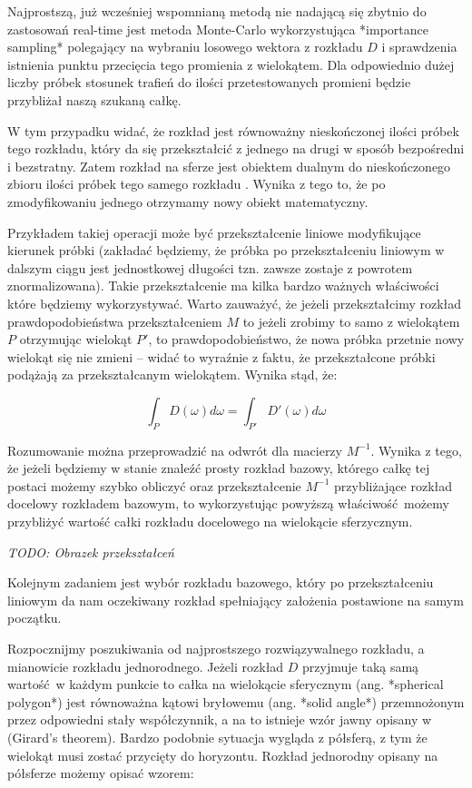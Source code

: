 \documentclass[../main.tex]{subfiles}
\begin{document}
Najprostszą, już wcześniej wspomnianą metodą nie nadającą się zbytnio do
zastosowań real-time jest metoda Monte-Carlo wykorzystująca *importance
sampling* polegający na wybraniu losowego wektora z rozkładu $D$ i sprawdzenia
istnienia punktu przecięcia tego promienia z wielokątem. Dla odpowiednio dużej
liczby próbek stosunek trafień do ilości przetestowanych promieni będzie
przybliżał naszą szukaną całkę.

W tym przypadku widać, że rozkład jest równoważny nieskończonej ilości próbek
tego rozkładu, który da się przekształcić z jednego na drugi w sposób
bezpośredni i bezstratny. Zatem rozkład na sferze jest obiektem dualnym do
nieskończonego zbioru ilości próbek tego samego rozkładu \cite{ltc_heitz}.
Wynika z tego to, że po zmodyfikowaniu jednego otrzymamy nowy obiekt
matematyczny.

Przykładem takiej operacji może być przekształcenie liniowe modyfikujące
kierunek próbki (zakładać będziemy, że próbka po przekształceniu liniowym w
dalszym ciągu jest jednostkowej długości tzn. zawsze zostaje z powrotem
znormalizowana). Takie przekształcenie ma kilka bardzo ważnych właściwości
które będziemy wykorzystywać. Warto zauważyć, że jeżeli przekształcimy rozkład
prawdopodobieństwa przekształceniem $M$ to jeżeli zrobimy to samo z wielokątem
$P$ otrzymując wielokąt $P'$, to prawdopodobieństwo, że nowa próbka przetnie
nowy wielokąt się nie zmieni – widać to wyraźnie z faktu, że przekształcone
próbki podążają za przekształcanym wielokątem. Wynika stąd, że:

$$
\int_P {
  D(\omega)
  d \omega
} = \int_{P'} {
  D'(\omega)
  d\omega
}
$$

Rozumowanie można przeprowadzić na odwrót dla macierzy $M^{-1}$. Wynika z tego,
że jeżeli będziemy w stanie znaleźć prosty rozkład bazowy, którego całkę tej
postaci możemy szybko obliczyć oraz przekształcenie $M^{-1}$ przybliżające
rozkład docelowy rozkładem bazowym, to wykorzystując powyższą właściwość możemy
przybliżyć wartość całki rozkładu docelowego na wielokącie sferzycznym.

\textit{TODO: Obrazek przekształceń}

Kolejnym zadaniem jest wybór rozkładu bazowego, który po przekształceniu
liniowym da nam oczekiwany rozkład spełniający założenia postawione na
samym początku.

Rozpocznijmy poszukiwania od najprostszego rozwiązywalnego rozkładu, a
mianowicie rozkładu jednorodnego. Jeżeli rozkład $D$ przyjmuje taką samą
wartość w każdym punkcie to całka na wielokącie sferycznym (ang. *spherical
polygon*) jest równoważna kątowi bryłowemu (ang. *solid angle*) przemnożonym
przez odpowiedni stały współczynnik, a na to istnieje wzór jawny opisany w
\cite{Arvo} \cite{Snyder} (Girard's theorem). Bardzo podobnie sytuacja wygląda
z półsferą, z tym że wielokąt musi zostać przycięty do horyzontu. Rozkład
jednorodny opisany na półsferze możemy opisać wzorem:
\end{document}
